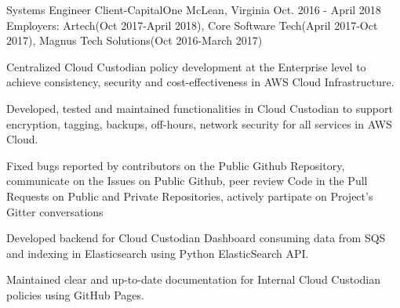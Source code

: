 \begin{cventries}
  \cventryemp
    {Systems Engineer} %
    {Client-CapitalOne} %
    {McLean, Virginia} %
    {Oct. 2016 - April 2018} %
    {Employers: Artech(Oct 2017-April 2018), Core Software Tech(April 2017-Oct 2017), Magnus Tech Solutions(Oct 2016-March 2017)}
    {
      \begin{cvitems} %
        \item {Centralized Cloud Custodian policy development at the Enterprise level to achieve consistency, security and cost-effectiveness in AWS Cloud Infrastructure.}
        \item {Developed, tested and maintained functionalities in Cloud Custodian to support encryption, tagging, backups, off-hours, network security for all services in AWS Cloud.}
        \item {Fixed bugs reported by contributors on the Public Github Repository, communicate on the Issues on Public Github, peer review Code in the Pull Requests on Public and Private Repositories, actively partipate on Project's Gitter conversations}
        \item {Developed backend for Cloud Custodian Dashboard consuming data from SQS and indexing in Elasticsearch using Python ElasticSearch API.}
        \item {Maintained clear and up-to-date documentation for Internal Cloud Custodian policies using GitHub Pages.}
      \end{cvitems}
    }

\end{cventries}
